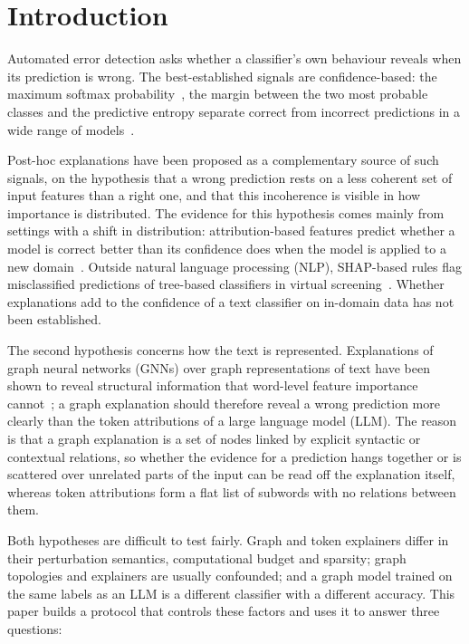 \documentclass[preprint, times, review, 10pt]{elsarticle}
\begin{document}
\section{Introduction}\label{Introduction}

Automated error detection asks whether a classifier's own behaviour reveals when its prediction is wrong. The best-established signals are confidence-based: the maximum softmax probability~\cite{hendrycks2017baseline}, the margin between the two most probable classes and the predictive entropy separate correct from incorrect predictions in a wide range of models~\cite{corbiere2019confidnet}.

Post-hoc explanations have been proposed as a complementary source of such signals, on the hypothesis that a wrong prediction rests on a less coherent set of input features than a right one, and that this incoherence is visible in how importance is distributed. The evidence for this hypothesis comes mainly from settings with a shift in distribution: attribution-based features predict whether a model is correct better than its confidence does when the model is applied to a new domain~\cite{ye2022calibrating}. Outside natural language processing (NLP), SHAP-based rules flag misclassified predictions of tree-based classifiers in virtual screening~\cite{bernal2025shap}. Whether explanations add to the confidence of a text classifier on in-domain data has not been established.

The second hypothesis concerns how the text is represented. Explanations of graph neural networks (GNNs) over graph representations of text have been shown to reveal structural information that word-level feature importance cannot~\cite{yuan2021structured}; a graph explanation should therefore reveal a wrong prediction more clearly than the token attributions of a large language model (LLM). The reason is that a graph explanation is a set of nodes linked by explicit syntactic or contextual relations, so whether the evidence for a prediction hangs together or is scattered over unrelated parts of the input can be read off the explanation itself, whereas token attributions form a flat list of subwords with no relations between them.

Both hypotheses are difficult to test fairly. Graph and token explainers differ in their perturbation semantics, computational budget and sparsity; graph topologies and explainers are usually confounded; and a graph model trained on the same labels as an LLM is a different classifier with a different accuracy. This paper builds a protocol that controls these factors and uses it to answer three questions:
\end{document}
